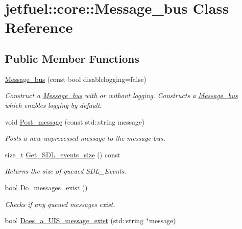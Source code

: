 \hypertarget{classjetfuel_1_1core_1_1Message__bus}{}\section{jetfuel\+:\+:core\+:\+:Message\+\_\+bus Class Reference}
\label{classjetfuel_1_1core_1_1Message__bus}
\subsection*{Public Member Functions}
\begin{DoxyCompactItemize}
\item 
\hyperlink{classjetfuel_1_1core_1_1Message__bus_abf8b94890bd7223f9fa3f7d861ee96ab}{Message\+\_\+bus} (const bool disablelogging=false)
\begin{DoxyCompactList}\small\item\em Construct a \hyperlink{classjetfuel_1_1core_1_1Message__bus}{Message\+\_\+bus} with or without logging. Constructs a \hyperlink{classjetfuel_1_1core_1_1Message__bus}{Message\+\_\+bus} which enables logging by default. \end{DoxyCompactList}\item 
void \hyperlink{classjetfuel_1_1core_1_1Message__bus_a7a36c1ebc19327ddb554d6f8199a6965}{Post\+\_\+message} (const std\+::string message)
\begin{DoxyCompactList}\small\item\em Posts a new unprocessed message to the message bus. \end{DoxyCompactList}\item 
size\+\_\+t \hyperlink{classjetfuel_1_1core_1_1Message__bus_aa363b50d4ba99ae86430b5f12610fd39}{Get\+\_\+\+S\+D\+L\+\_\+events\+\_\+size} () const
\begin{DoxyCompactList}\small\item\em Returns the size of queued S\+D\+L\+\_\+\+Events. \end{DoxyCompactList}\item 
bool \hyperlink{classjetfuel_1_1core_1_1Message__bus_a81015af8f393e028c4e9e670167aa013}{Do\+\_\+messages\+\_\+exist} ()
\begin{DoxyCompactList}\small\item\em Checks if any queued messages exist. \end{DoxyCompactList}\item 
bool \hyperlink{classjetfuel_1_1core_1_1Message__bus_a0b91a46865f5888bd1c3e2e3bdbc49ee}{Does\+\_\+a\+\_\+\+U\+I\+S\+\_\+message\+\_\+exist} (std\+::string $\ast$message)

\end{DoxyCompactItemize}
